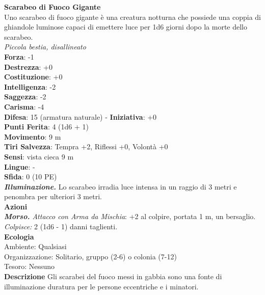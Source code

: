 \begin{multicols}{2}
\medskip\textbf{Scarabeo di Fuoco Gigante}\\
Uno scarabeo di fuoco gigante è una creatura notturna che possiede una coppia di ghiandole luminose capaci di emettere luce per 1d6 giorni dopo la morte dello scarabeo.\\
\emph{Piccola bestia, disallineato}\\
\textbf{Forza}: -1\\
\textbf{Destrezza}: +0\\
\textbf{Costituzione}: +0\\
\textbf{Intelligenza}: -2\\
\textbf{Saggezza}: -2\\
\textbf{Carisma}: -4\\
\textbf{Difesa}: 15 (armatura naturale) - \textbf{Iniziativa}: +0\\
\textbf{Punti Ferita}: 4 (1d6 + 1)\\
\textbf{Movimento}: 9 m\\
\textbf{Tiri Salvezza}: Tempra +2, Riflessi +0, Volontà +0\\
\textbf{Sensi}: vista cieca 9 m\\
\textbf{Lingue}: -\\
\textbf{Sfida}: 0 (10 PE)\smallskip\\
\emph{\textbf{Illuminazione.}} Lo scarabeo irradia luce intensa in un raggio di 3 metri e penombra per ulteriori 3 metri.\\
\smallskip\textbf{Azioni}\\
\emph{\textbf{Morso.} Attacco con Arma da Mischia}: +2 al colpire, portata 1 m, un bersaglio.\\
\emph{Colpisce:} 2 (1d6 - 1) danni taglienti.\\
\textbf{Ecologia}\\
Ambiente: Qualsiasi\\
Organizzazione: Solitario, gruppo (2-6) o colonia (7-12)\\
Tesoro: Nessuno\\
\textbf{Descrizione}
Gli scarabei del fuoco messi in gabbia sono una fonte di illuminazione duratura per le persone eccentriche e i minatori.


\end{multicols}
